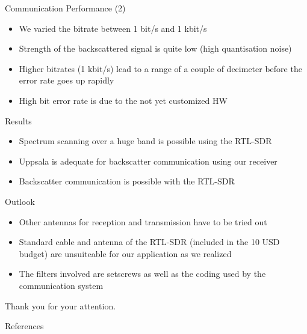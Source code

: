 \documentclass[apectratio=169]{beamer}
\begin{document}
\begin{frame}{Communication Performance (2)}
	\begin{itemize}
		\item<1-> We varied the bitrate between 1 bit/s and 1 kbit/s 
		\item<2-> Strength of the backscattered signal is quite low (high quantisation noise)
		\item<3-> Higher bitrates (1 kbit/s) lead to a range of a couple of decimeter before the error rate goes up rapidly
		\item<4-> High bit error rate is due to the not yet customized HW
	\end{itemize}
\end{frame}

\begin{frame}{Results}
	\begin{itemize}
		\item<1-> Spectrum scanning over a huge band is possible using the RTL-SDR
		\item<2-> Uppsala is adequate for backscatter communication using our receiver
		\item<3-> Backscatter communication is possible with the RTL-SDR
	\end{itemize}
\end{frame}

\begin{frame}{Outlook}
	\begin{itemize}
		\item<1-> Other antennas for reception and transmission have to be tried out
		\item<2-> Standard cable and antenna of the RTL-SDR (included in the 10 USD budget) are unsuiteable for our application as we realized
		\item<3-> The filters involved are setscrews as well as the coding used by the communication system
	\end{itemize}
\end{frame}



\begin{frame}[standout]
	Thank you for your attention. 
\end{frame}

\begin{frame}[allowframebreaks]{References}

  
  

\end{frame}
\end{document}
